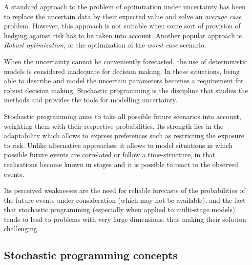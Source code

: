 A standard approach to the problem of optimization under uncertainty
has been to replace the uncertain data by their expected value and
solve an {\em average case} problem. However, this approach is not
suitable when some sort of provision of hedging against risk has to be
taken into account. Another popular approach is {\em Robust
optimization}, or the optimization of the {\em worst case}
scenario. 

When the uncertainty cannot be conveniently forecasted, the use of 
deterministic models is considered inadequate for decision making. In 
these situations, being able to describe and model the uncertain parameters
becomes a requirement for robust decision making. Stochastic 
programming \cite{BirgeLouveaux,KallWallace} is the discipline that 
studies the methods and provides the tools for modelling uncertainty.

Stochastic programming aims to take all possible future scenarios 
into account, weighting them
with their respective probabilities. Its strength lies in the
adaptability which allows to express preferences such as restricting
the exposure to risk. Unlike alternative approaches, it allows to model
situations in which possible future events are correlated or follow a
time-structure, in that realisations become known in stages and it is
possible to react to the observed events.

Its perceived weaknesses are the need for reliable forecasts
of the probabilities of the future events under consideration
(which may not be available), and the fact that stochastic programming
(especially when applied to multi-stage models) tends to lead to
problems with very large dimensions, thus making their solution
challenging. 

%
%
\subsection{Stochastic programming concepts}

